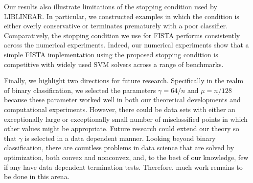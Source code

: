\documentclass[twoside,11pt]{article}
\begin{document}
Our results also illustrate limitations of the stopping condition used by LIBLINEAR. In particular, we constructed examples in which the condition is either overly conservative or terminates prematurely with a poor classifier. Comparatively, the stopping condition we use for FISTA performs consistently across the numerical experiments. Indeed, our numerical experiments show that a simple FISTA implementation using the proposed stopping condition is competitive with widely used SVM solvers across a range of benchmarks. 

Finally, we highlight two directions for future research. Specifically in the realm of binary classification, we selected the parameters $\gamma=64/n$ and $\mu = n/128$ because these parameter worked well in both our theoretical developments and computational experiments. However, there could be data sets with either an exceptionally large or exceptionally small number of misclassified points in which other values might be appropriate. Future research could extend our theory so that $\gamma$ is selected in a data dependent manner. Looking beyond binary classification, there are countless problems in data science that are solved by optimization, both convex and nonconvex, and, to the best of our knowledge, few if any have data dependent termination tests.  Therefore, much work remains to be done in this arena.




\newpage

\appendix
\end{document}
